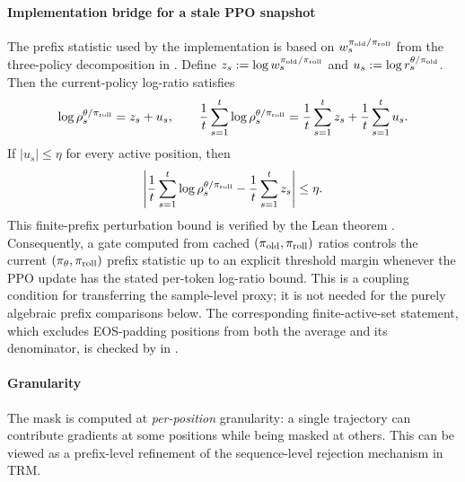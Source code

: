 \paragraph{Implementation bridge for a stale PPO snapshot}
The prefix statistic used by the implementation is based on
$w_s^{\pi_{\mathrm{old}}/\pi_{\mathrm{roll}}}$ from the three-policy decomposition in
. Define
$z_s:=\log w_s^{\pi_{\mathrm{old}}/\pi_{\mathrm{roll}}}$ and
$u_s:=\log r_s^{\theta/\pi_{\mathrm{old}}}$. Then the current-policy log-ratio satisfies
\begin{equation*}
    \log\rho_s^{\theta/\pi_{\mathrm{roll}}}=z_s+u_s,
    \qquad
    \frac{1}{t}\sum_{s=1}^{t}\log\rho_s^{\theta/\pi_{\mathrm{roll}}}
    =
    \frac{1}{t}\sum_{s=1}^{t}z_s
    +
    \frac{1}{t}\sum_{s=1}^{t}u_s.
\end{equation*}
If $|u_s|\le\eta$ for every active position, then
\begin{equation*}
    \left|
    \frac{1}{t}\sum_{s=1}^{t}\log\rho_s^{\theta/\pi_{\mathrm{roll}}}
    -
    \frac{1}{t}\sum_{s=1}^{t}z_s
    \right|
    \le \eta.
\end{equation*}
This finite-prefix perturbation bound is verified by the Lean theorem
. Consequently, a gate
computed from cached $(\pi_{\mathrm{old}},\pi_{\mathrm{roll}})$ ratios controls the current
$(\pi_{\theta},\pi_{\mathrm{roll}})$ prefix statistic up to an explicit threshold margin
whenever the PPO update has the stated per-token log-ratio bound. This is a
coupling condition for transferring the sample-level proxy; it is not needed
for the purely algebraic prefix comparisons below.
The corresponding finite-active-set statement, which excludes EOS-padding
positions from both the average and its denominator, is checked by
 in
.

\paragraph{Granularity} The mask is computed at \emph{per-position} granularity: a single trajectory can contribute gradients at some
positions while being masked at others. This can be viewed as a prefix-level refinement of the sequence-level rejection mechanism in TRM.

